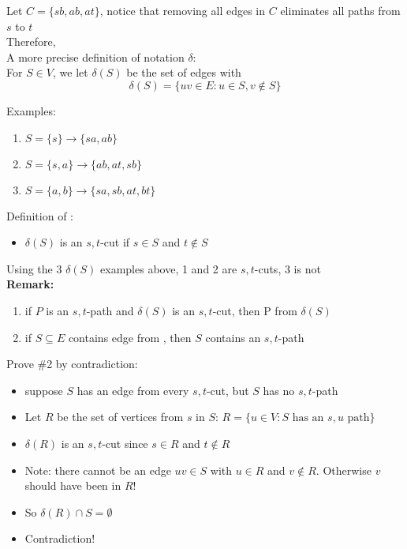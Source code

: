 \documentclass[letterpaper, 12pt]{article}
\newcommand{\red}[1]{{\color{red}{#1}}}
\begin{document}
    Let $C = \{sb, ab, at\}$, notice that removing all edges in $C$ eliminates all paths from $s$ to $t$\\
    Therefore, \red{every $s,t$-path must have at least one edge in $C$}\\
    \bigskip
    A more precise definition of notation $\delta$:\\
    For $S \in V$, we let $\delta(S)$ be the set of edges with \red{exactly one endpoint in $S$}\\
    $$\delta(S) = \{uv \in E : u \in S, v \notin S\}$$

    Examples:\\
    \begin{enumerate}
        \item $S =\{s\} \rightarrow \{sa, ab\}$
        \item $S =\{s, a\} \rightarrow \{ab, at, sb\}$
        \item $S =\{a, b\} \rightarrow \{sa, sb, at, bt\}$
    \end{enumerate}

    Definition of \red{$s,t$-cut}:\\
    \begin{itemize}
        \item $\delta(S)$ is an $s,t$-cut if $s \in S$ and $t \notin S$
    \end{itemize}
    
    Using the 3 $\delta(S)$ examples above, 1 and 2 are $s,t$-cuts, 3 is not\\

    \bigskip
    \textbf{Remark:}
    \begin{enumerate}
        \item if $P$ is an $s,t$-path and $\delta(S)$ is an $s,t$-cut, then P \red{must have an edge} from $\delta(S)$
        \item if $S \subseteq E$ contains \red{at least one} edge from \red{every $s,t$-cut}, then $S$ contains an $s,t$-path
    \end{enumerate}
    \pagebreak
    Prove \#2 by contradiction:\\
    \begin{itemize}
        \item suppose $S$ has an edge from every $s,t$-cut, but $S$ has no $s,t$-path
        \item Let $R$ be the set of vertices \red{reachable} from $s$ in $S$: $R = \{u \in V : S \text{ has an }s,u \text{ path}\}$
        \item $\delta(R)$ is an $s,t$-cut since $s \in R$ and $t \notin R$
        \item Note: there cannot be an edge $uv \in S$ with $u \in R$ and $v \notin R$. Otherwise $v$ should have been in $R$!
        \item So $\delta(R) \cap S = \emptyset$
        \item Contradiction!
    \end{itemize}
\end{document}
